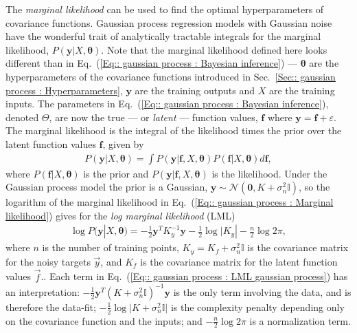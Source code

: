 \documentclass[twoside,english]{uiofysmaster}
\begin{document}
{{The \textit{marginal likelihood} can be used to find the optimal hyperparameters of covariance functions. Gaussian process regression models with Gaussian noise have the wonderful trait of analytically tractable integrals for the marginal likelihood, $P(\textbf{y}|X, \boldsymbol{\theta})$. Note that the marginal likelihood defined here looks different than in Eq.~(\ref{Eq:: gaussian process : Bayesian inference}) --- $\boldsymbol{\theta}$ are the hyperparameters of the covariance functions introduced in Sec.~\ref{Sec:: gaussian process : Hyperparameters}, $\textbf{y}$ are the training outputs and $X$ are the training inputs. The parameters in Eq.~(\ref{Eq:: gaussian process : Bayesian inference}), denoted $\Theta$, are now the true --- or \textit{latent} --- function values, $\textbf{f}$ where $\textbf{y} = \textbf{f} + \varepsilon$. The marginal likelihood is the integral of the likelihood times the prior over the latent function values $\textbf{f}$, given by
\begin{align}\label{Eq:: gaussian process : Marginal likelihood}
P(\textbf{y} | X, \boldsymbol{\theta}) = \int P(\textbf{y}| \textbf{f}, X, \boldsymbol{\theta}) P (\textbf{f}|X, \boldsymbol{\theta})d \textbf{f},
\end{align}
where $P(\textbf{f}|X, \boldsymbol{\theta})$ is the prior and $P(\textbf{y}|\textbf{f},X, \boldsymbol{\theta})$ is the likelihood. Under the Gaussian process model the prior is a Gaussian, $\textbf{y} \sim \mathcal{N}(\textbf{0}, K + \sigma^2_n \mathbb{I})$, so the logarithm of the marginal likelihood in Eq.~(\ref{Eq:: gaussian process : Marginal likelihood}) gives for the \textit{log marginal likelihood} (LML) \cite{rasmussen2006gaussian} 
\begin{align}\label{Eq:: gaussian process : LML gaussian process}
\log P(\textbf{y}|X, \boldsymbol{\theta}) = - \frac{1}{2} \textbf{y}^T K_y^{-1} \textbf{y} - \frac{1}{2} \log \big|K_y| - \frac{n}{2} \log 2 \pi,
\end{align}
where $n$ is the number of training points, $K_y = K_f + \sigma_n^2 \mathbb{I}$ is the covariance matrix for the noisy targets $\vec{y}$, and $K_f$ is the covariance matrix for the latent function values $\vec{f}$.. Each term in Eq.~(\ref{Eq:: gaussian process : LML gaussian process}) has an interpretation: $- \frac{1}{2} \textbf{y}^T (K + \sigma_n^2 \mathbb{I})^{-1} \textbf{y}$ is the only term involving the data, and is therefore the data-fit; $-\frac{1}{2} \log \big| K + \sigma_n^2 \mathbb{I} \big|$ is the complexity penalty depending only on the covariance function and the inputs; and $- \frac{n}{2} \log 2 \pi$ is a normalization term. 

}}
\end{document}
